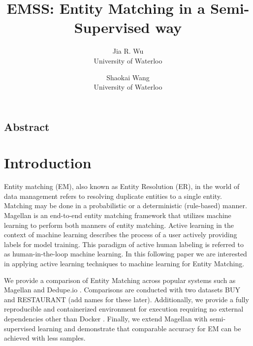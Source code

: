 \documentclass[letterpaper,twocolumn,10pt]{article}
\begin{document}
\date{}

\title{\Large \bf EMSS: Entity Matching in a Semi-Supervised way}




\author{
{\rm Jia R. Wu}\\
University of Waterloo
\and
{\rm Shaokai Wang}\\
University of Waterloo
} %

\maketitle

\thispagestyle{empty}


\subsection*{Abstract}



\section{Introduction}
Entity matching (EM), also known as Entity Resolution (ER), in the world of data management refers to resolving duplicate entities to a single entity. Matching may be done in a probabilistic or a deterministic (rule-based) manner.  Magellan is an end-to-end entity matching framework that utilizes machine learning to perform both manners of entity matching. Active learning in the context of machine learning describes the process of a user actively providing labels for model training. This paradigm of active human labeling is referred to as human-in-the-loop machine learning. In this following paper we are interested in applying active learning techniques to machine learning for Entity Matching. 

We provide a comparison of Entity Matching across popular systems such as Magellan and Dedupe.io \cite{bilenko2004learnable}. Comparisons are conducted with two datasets BUY and RESTAURANT (add names for these later). Additionally, we provide a fully reproducible and containerized environment for execution requiring no external dependencies other than Docker \cite{docker:2014}. Finally, we extend Magellan with semi-supervised learning and demonstrate that comparable accuracy for EM can be achieved with less samples. 
\\
\end{document}
